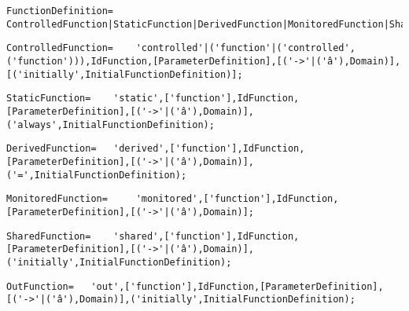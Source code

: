 \documentclass{article}
\begin{document}
    \begin{flushleft}
    \begin{lstlisting}[mathescape=true, breaklines=true]
     FunctionDefinition= 	ControlledFunction|StaticFunction|DerivedFunction|MonitoredFunction|SharedFunction|OutFunction;
    \end{lstlisting}
    \end{flushleft}
    \begin{flushleft}
    \begin{lstlisting}[mathescape=true, breaklines=true]
     ControlledFunction= 	'controlled'|('function'|('controlled',('function'))),IdFunction,[ParameterDefinition],[('->'|('â'),Domain)],[('initially',InitialFunctionDefinition)];
    \end{lstlisting}
    \end{flushleft}
    \begin{flushleft}
    \begin{lstlisting}[mathescape=true, breaklines=true]
     StaticFunction= 	'static',['function'],IdFunction,[ParameterDefinition],[('->'|('â'),Domain)],('always',InitialFunctionDefinition);
    \end{lstlisting}
    \end{flushleft}
    \begin{flushleft}
    \begin{lstlisting}[mathescape=true, breaklines=true]
     DerivedFunction= 	'derived',['function'],IdFunction,[ParameterDefinition],[('->'|('â'),Domain)],('=',InitialFunctionDefinition);
    \end{lstlisting}
    \end{flushleft}
    \begin{flushleft}
    \begin{lstlisting}[mathescape=true, breaklines=true]
     MonitoredFunction= 	'monitored',['function'],IdFunction,[ParameterDefinition],[('->'|('â'),Domain)];
    \end{lstlisting}
    \end{flushleft}
    \begin{flushleft}
    \begin{lstlisting}[mathescape=true, breaklines=true]
     SharedFunction= 	'shared',['function'],IdFunction,[ParameterDefinition],[('->'|('â'),Domain)],('initially',InitialFunctionDefinition);
    \end{lstlisting}
    \end{flushleft}
    \begin{flushleft}
    \begin{lstlisting}[mathescape=true, breaklines=true]
     OutFunction= 	'out',['function'],IdFunction,[ParameterDefinition],[('->'|('â'),Domain)],('initially',InitialFunctionDefinition);
    \end{lstlisting}
    \end{flushleft}
\end{document}
